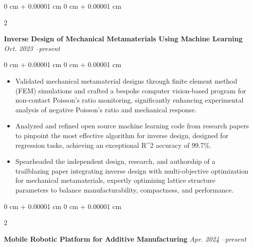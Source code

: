 ﻿\documentclass[10pt, letterpaper]{article}
\newenvironment{highlights}{
    \begin{itemize}[
        topsep=0.10 cm,
        parsep=0.10 cm,
        partopsep=0pt,
        itemsep=0pt,
        leftmargin=0 cm + 10pt
    ]
}{
    \end{itemize}
} %
\newenvironment{onecolentry}{
    \begin{adjustwidth}{
        0 cm + 0.00001 cm
    }{
        0 cm + 0.00001 cm
    }
}{
    \end{adjustwidth}
} %
\newenvironment{twocolentry}[2][]{
    \onecolentry
    \def\secondColumn{#2}
    \setcolumnwidth{\fill, 4.5 cm}
    \begin{paracol}{2}
}{
    \switchcolumn \raggedleft \secondColumn
    \end{paracol}
    \endonecolentry
} %
\begin{document}
        \begin{twocolentry}{
            \textit{Oct. 2023 --present}
        }
            \textbf{Inverse Design of Mechanical Metamaterials Using Machine Learning}\end{twocolentry}
        \vspace{0.10 cm}
        \begin{onecolentry}
            \begin{highlights}
                \item Validated mechanical metamaterial designs through finite element method (FEM) simulations and crafted a bespoke computer vision-based program for non-contact Poisson's ratio monitoring, significantly enhancing experimental analysis of negative Poisson's ratio and mechanical response.
                
                \item Analyzed and refined open source machine learning code from research papers to pinpoint the most effective algorithm for inverse design, designed for regression tasks, achieving an exceptional R^2 accuracy of 99.7\%.
                
                \item Spearheaded the independent design, research, and authorship of a trailblazing paper integrating inverse design with multi-objective optimization for mechanical metamaterials, expertly optimizing lattice structure parameters to balance manufacturability, compactness, and performance.
            \end{highlights}
        \end{onecolentry}

        \begin{twocolentry}{
            \textit{Apr. 2024 --present}
        }
            \textbf{Mobile Robotic Platform for Additive Manufacturing }\end{twocolentry}
\end{document}
